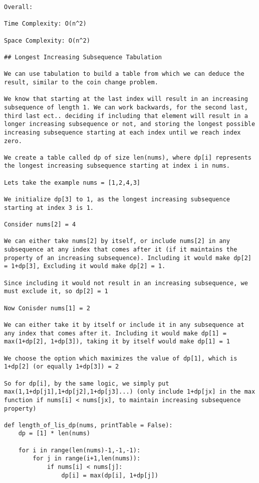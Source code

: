 \begin{verbatim}
Overall:

Time Complexity: O(n^2)

Space Complexity: O(n^2)

## Longest Increasing Subsequence Tabulation

We can use tabulation to build a table from which we can deduce the result, similar to the coin change problem.

We know that starting at the last index will result in an increasing subsequence of length 1. We can work backwards, for the second last, third last ect.. deciding if including that element will result in a longer increasing subsequence or not, and storing the longest possible increasing subsequence starting at each index until we reach index zero.

We create a table called dp of size len(nums), where dp[i] represents the longest increasing subsequence starting at index i in nums.

Lets take the example nums = [1,2,4,3]

We initialize dp[3] to 1, as the longest increasing subsequence starting at index 3 is 1.

Consider nums[2] = 4

We can either take nums[2] by itself, or include nums[2] in any subsequence at any index that comes after it (if it maintains the property of an increasing subsequence). Including it would make dp[2] = 1+dp[3], Excluding it would make dp[2] = 1.

Since including it would not result in an increasing subsequence, we must exclude it, so dp[2] = 1

Now Conisder nums[1] = 2

We can either take it by itself or include it in any subsequence at any index that comes after it. Including it would make dp[1] = max(1+dp[2], 1+dp[3]), taking it by itself would make dp[1] = 1

We choose the option which maximizes the value of dp[1], which is 1+dp[2] (or equally 1+dp[3]) = 2

So for dp[i], by the same logic, we simply put max(1,1+dp[j1],1+dp[j2],1+dp[j3]...) (only include 1+dp[jx] in the max function if nums[i] < nums[jx], to maintain increasing subsequence property)

def length_of_lis_dp(nums, printTable = False):
    dp = [1] * len(nums)

    for i in range(len(nums)-1,-1,-1):
        for j in range(i+1,len(nums)):
            if nums[i] < nums[j]:
                dp[i] = max(dp[i], 1+dp[j])


\end{verbatim}
